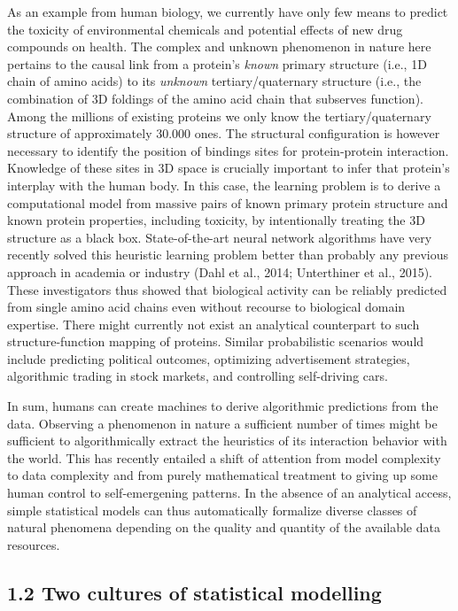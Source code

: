 \documentclass[authoryear,review,3p]{elsarticle}
\begin{document}
As an example from human biology,
we currently have only few means to predict the
toxicity of environmental chemicals and
potential effects of new drug compounds on health.
%
The complex and unknown phenomenon in nature here pertains
to the causal link from
a protein's \textit{known} primary structure
(i.e., 1D chain of amino acids)
to
its \textit{unknown} tertiary/quaternary structure
(i.e., the combination of 3D foldings
of the amino acid chain that subserves function).
%
Among the millions of existing proteins
we only know the tertiary/quaternary structure of
approximately 30.000 ones.
The structural configuration is however necessary to identify the position of
bindings sites for protein-protein interaction.
Knowledge of these sites in 3D space is crucially important
to infer that protein's interplay with the human body.
%
In this case,
the learning problem is to
derive a computational model from
massive pairs of known primary protein structure and
known protein properties, including toxicity,
by intentionally treating the 3D structure
as a black box.
%
State-of-the-art neural network algorithms
have very recently solved this heuristic learning problem
better than probably any previous approach in academia or industry
(Dahl et al., 2014; Unterthiner et al., 2015).
These investigators thus showed that biological activity
can be reliably predicted from single amino acid chains
even without recourse to biological domain expertise.
%
There might currently not exist
an analytical counterpart to such
structure-function mapping of proteins.
%
%
Similar probabilistic scenarios would include predicting
political outcomes,
optimizing advertisement strategies,
algorithmic trading in stock markets, and
controlling self-driving cars.


In sum,
humans can create machines to derive
algorithmic predictions from the data.
Observing a phenomenon in nature a sufficient number of times
might be sufficient to
algorithmically extract
the heuristics of its interaction behavior with the world.
This has recently entailed a shift
of attention
from model complexity to data complexity
and
from purely mathematical treatment to giving up some
human control to self-emergening patterns.
In the absence of an analytical access,
simple statistical models can thus automatically
formalize diverse classes of natural phenomena
depending on the quality and quantity of
the available data resources.



\subsection*{1.2 Two cultures of statistical modelling}
\end{document}
